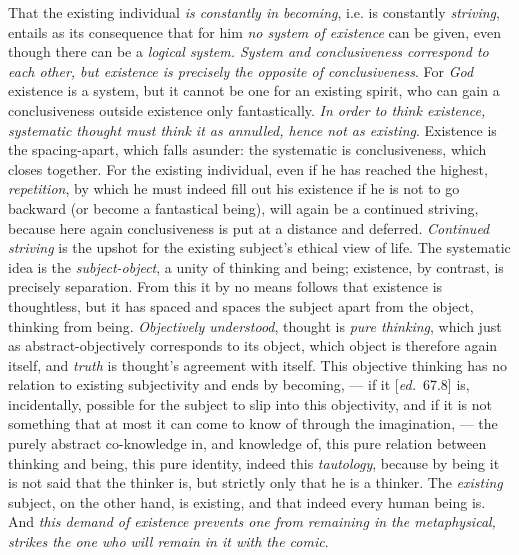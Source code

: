 \documentclass[12pt,a4paper,openany]{book}
\newcommand{\kpage}[1]{\marginnote{\footnotesize\textit{[#1]}}}
\newcommand{\ed}[1]{{\small[\textit{ed.}\ #1]}}
\begin{document}
That the existing individual \emph{is constantly in becoming}, i.e. is constantly \emph{striving},
entails as its consequence that for him \emph{no system of existence}
can be given, even though there can be a \emph{logical system. System and conclusiveness
correspond to each other, but existence is precisely the opposite of conclusiveness}. For
\emph{God} existence is a system, but it cannot be one for an existing
spirit, who can gain a conclusiveness outside existence only
fantastically. \emph{In order to think existence, systematic thought must think it
as annulled, hence not as existing}. Existence is the spacing-apart, which
falls asunder: the systematic is conclusiveness, which closes
together. For the existing individual, even if he has reached the highest,
\emph{repetition}, by which he must indeed fill out his existence if
he is not to go backward (or become a fantastical being), will again
be a continued striving, because here again conclusiveness is put at a distance and
deferred. \emph{Continued striving} is the upshot for the existing subject's
ethical view of life. The systematic idea is the \emph{subject-object}, a
unity of thinking and being; existence, by contrast, is precisely separation\kpage{114}.
From this it by no means follows that existence is thoughtless, but it has
spaced and spaces the subject apart from the object, thinking from being. \emph{Objectively
understood}, thought is \emph{pure thinking}, which just as abstract-objectively
corresponds to its object, which object is therefore again itself, and
\emph{truth} is thought's agreement with itself. This
objective thinking has no relation to existing subjectivity
and ends by becoming, --- if it \ed{67.8} is, incidentally, possible for
the subject to slip into this objectivity, and if it is not something
that at most it can come to know of through the imagination,
--- the purely abstract co-knowledge in, and knowledge of, this pure relation
between thinking and being, this pure identity, indeed this \emph{tautology},
because by being it is not said that the thinker is, but strictly
only that he is a thinker. The \emph{existing} subject, on the other hand, is existing,
and that indeed every human being is. And \emph{this demand of existence prevents one
from remaining in the metaphysical, strikes the one who will remain in it with the comic}.
\end{document}
